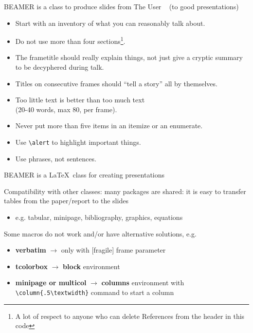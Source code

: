 \documentclass[11pt]{beamer} %
\begin{document}
\begin{frame}[fragile]{BEAMER is a class to produce slides}
\alert{from The User \href{http://tug.ctan.org/macros/latex/contrib/beamer/doc/beameruserguide.pdf}{}~\autocite{Tantau2022} (to good presentations)}
	\begin{itemize}
		\item Start with an inventory of what you can reasonably talk about.
		\item Do not use more than four sections\footnote{\alert{A lot of respect to anyone who can delete References from the header in this code}}.
		
		\item The frametitle should really explain things, not just give a cryptic summary to be decyphered during talk.
		\item Titles on consecutive frames should ``tell a story'' all by themselves.
		\item Too little text is better than too much text 
		\\(20-40 words, max 80, per frame).
		\item Never put more than five items in an itemize or an enumerate.
		\item Use \verb|\alert| to highlight important things.
		\item Use phrases, not sentences.
	\end{itemize}
	
\end{frame}

\begin{frame}{}
	\begin{exampleblock}{BEAMER}
		is a \LaTeX~class for creating presentations
	\end{exampleblock}

	\begin{block}{Compatibility with other classes:}
		many packages are shared: it is easy to transfer tables from the paper/report to the slides
		\begin{itemize}
			\item e.g. tabular, minipage, bibliography, graphics, equations
		\end{itemize}
	 Some \alert{macros do not work} and/or have alternative solutions, e.g. 
		\begin{itemize}
			\item \textbf{verbatim} $\rightarrow$ only with [fragile] frame parameter
			\item \textbf{tcolorbox} $\rightarrow$ \textbf{block} environment
			\item \textbf{minipage or multicol} $\rightarrow$ \textbf{columns} environment with \verb|\column{.5\textwidth}| command to start a column
		\end{itemize}
	\end{block}
\end{frame}
\end{document}
